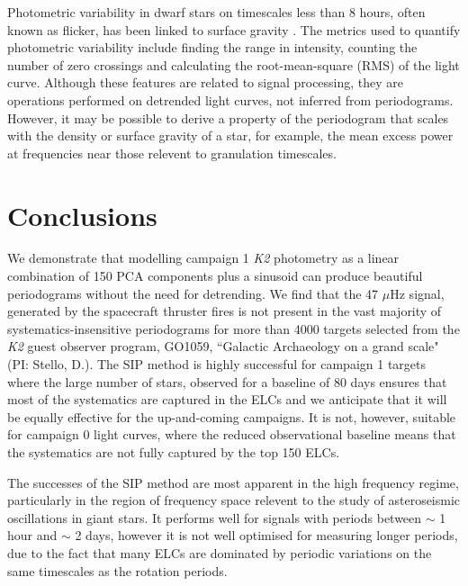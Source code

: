 \documentclass[useAMS, usenatbib, preprint, 12pt]{aastex}
\begin{document}
Photometric variability in dwarf stars on timescales less than 8 hours, often
known as flicker, has been linked to surface gravity
\citep[][]{Bastien2013, Kipping2014}.
The metrics used to quantify photometric variability include finding the range
in intensity, counting the number of zero crossings and calculating the
root-mean-square (RMS) of the light curve.
Although these features are related to signal processing, they are operations
performed on detrended light curves, not inferred from periodograms.
However, it may be possible to derive a property of the periodogram that scales
with the density or surface gravity of a star, for example, the mean excess
power at frequencies near those relevent to granulation timescales.

\section{Conclusions}
We demonstrate that modelling campaign 1 {\it K2} photometry as a linear
combination of 150 PCA components plus a sinusoid can produce beautiful
periodograms without the need for detrending.
We find that the 47 $\mu$Hz signal, generated by the spacecraft thruster
fires is not present in the vast majority of systematics-insensitive
periodograms for more than 4000 targets
selected from the {\it K2} guest observer program, GO1059, ``Galactic
Archaeology on a grand scale" (PI: Stello, D.).
The SIP method is highly successful for campaign 1 targets where the large
number of stars, observed for a baseline of 80 days ensures that most of the
systematics are captured in the ELCs and we anticipate that it will
be equally effective for the up-and-coming campaigns.
It is not, however, suitable for campaign 0 light curves, where the reduced
observational baseline means that the systematics are not fully captured by the
top 150 ELCs.

The successes of the SIP method are most apparent in the high frequency regime,
particularly in the region of frequency space relevent to the study of
asteroseismic oscillations in giant stars.
It performs well for signals with periods between $\sim$ 1 hour and $\sim$
2 days, however it is not well optimised for measuring longer periods, due to
the fact that many ELCs are dominated by periodic variations on the same
timescales as the rotation periods.
\end{document}
